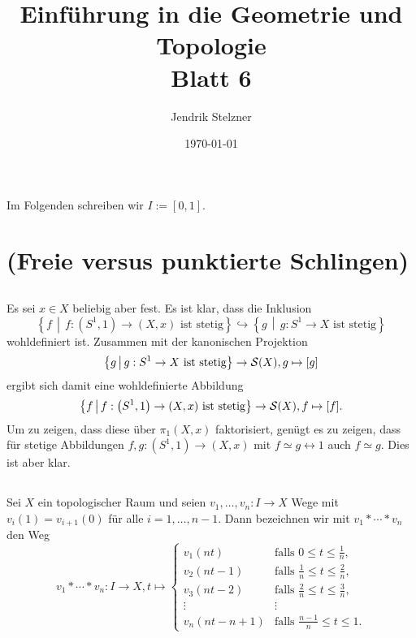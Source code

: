 \documentclass[a4paper,10pt]{article}
\title{\sc Einführung in die Geometrie und Topologie \\ \Large Blatt 6}
\author{Jendrik Stelzner}
\date{\today}
\begin{document}
\maketitle





Im Folgenden schreiben wir $I := [0,1]$.





\section{(Freie versus punktierte Schlingen)}


\subsection{}
Es sei $x \in X$ beliebig aber fest. Es ist klar, dass die Inklusion
\[
 \left\{ f \,\middle|\, f : \left(S^1,1\right) \to (X,x) \text{ ist stetig} \right\}
 \hookrightarrow
 \left\{ g \,\middle|\, g : S^1 \to X \text{ ist stetig}\right\}
 \]
wohldefiniert ist. Zusammen mit der kanonischen Projektion
\[
 \left\{ g \,\middle|\, g : S^1 \to X \text{ ist stetig}\right\} \to \mathcal{S}(X), g \mapsto [g]
\]
ergibt sich damit eine wohldefinierte Abbildung
\[
 \left\{ f \,\middle|\, f : \left(S^1,1\right) \to (X,x) \text{ ist stetig} \right\} \to \mathcal{S}(X), f \mapsto [f].
\]
Um zu zeigen, dass diese über $\pi_1(X,x)$ faktorisiert, genügt es zu zeigen, dass für stetige Abbildungen $f,g : (S^1, 1) \to (X, x)$ mit $f \simeq g \rel 1$ auch $f \simeq g$. Dies ist aber klar.


\subsection{}

\begin{defi}
 Sei $X$ ein topologischer Raum und seien $v_1, \ldots, v_n : I \to X$ Wege mit $v_i(1) = v_{i+1}(0)$ für alle $i=1,\ldots,n-1$. Dann bezeichnen wir mit $v_1 * \cdots * v_n$ den Weg
 \[
  v_1 * \cdots * v_n : I \to X, t \mapsto
  \begin{cases}
   v_1(nt)       & \text{falls } 0 \leq t \leq \frac{1}{n}, \\
   v_2(nt-1)     & \text{falls } \frac{1}{n} \leq t \leq \frac{2}{n}, \\
   v_3(nt-2)     & \text{falls } \frac{2}{n} \leq t \leq \frac{3}{n}, \\
   \vdots        & \vdots \\
   v_n(nt-n+1) & \text{falls } \frac{n-1}{n} \leq t \leq 1.
  \end{cases}
 \]
\end{defi}
\end{document}
